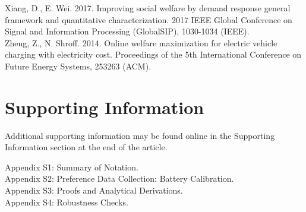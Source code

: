 \documentclass[10pt]{article}
\begin{document}
Xiang, D., E. Wei. 2017. Improving social welfare by demand response general framework and quantitative characterization. 2017 IEEE Global Conference on Signal and Information Processing (GlobalSIP), 1030-1034 (IEEE).\\
Zheng, Z., N. Shroff. 2014. Online welfare maximization for electric vehicle charging with electricity cost. Proceedings of the 5th International Conference on Future Energy Systems, 253263 (ACM).

\section*{Supporting Information}
Additional supporting information may be found online in the Supporting Information section at the end of the article.

Appendix S1: Summary of Notation.\\
Appendix S2: Preference Data Collection: Battery Calibration.\\
Appendix S3: Proofs and Analytical Derivations.\\
Appendix S4: Robustness Checks.
\end{document}
